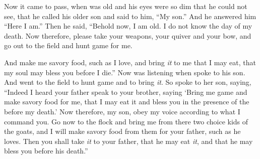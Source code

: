 
\bverse Now it came to pass, when \Isaac was old and his eyes were so dim that he could not see, that he called \Esau his older son and said to him, ``My son.'' And he answered him ``Here I am.''
\bverse Then he said, ``Behold now, I am old. I do not know the day of my death.
\bverse Now therefore, please take your weapons, your quiver and your bow, and go out to the field and hunt game for me.
 
\bverse And make me savory food, such as I love, and bring \textit{it} to me that I may eat, that my soul may bless you before I die.''
\bverse Now \Rebekah was listening when \Isaac spoke to \Esau his son. And \Esau went to the field to hunt game and to bring \textit{it}.
\bverse So \Rebekah spoke to \Jacob her son, saying, ``Indeed I heard your father speak to \Esau your brother, saying
\bverse `Bring me game and make savory food for me, that I may eat it and bless you in the presence of the \lord before my death.'
\bverse Now therefore, my son, obey my voice according to what I command you.
\bverse Go now to the flock and bring me from there two choice kids of the goats, and I will make savory food from them for your father, such as he loves.
\bverse Then you shall take \textit{it} to your father, that he may eat \textit{it}, and that he may bless you before his death.''

